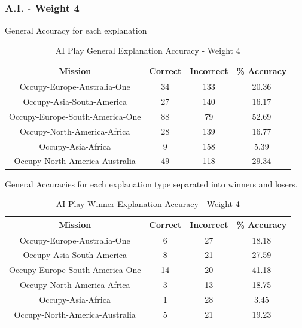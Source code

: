 \documentclass[parskip]{cs4rep}
\begin{document}
\newpage

\subsubsection{A.I. - Weight 4}

General Accuracy for each explanation

\begin{table}[ht]
\centering
\begin{tabular}{|c|c|c|c|}
\hline 
\textbf{Mission} & \textbf{Correct} & \textbf{Incorrect} & \textbf{\% Accuracy} \\ 
\hline 
Occupy-Europe-Australia-One & 34 & 133 & 20.36 \\  
\hline 
Occupy-Asia-South-America & 27 & 140 & 16.17 \\ 
\hline
Occupy-Europe-South-America-One & 88 & 79 & 52.69 \\
\hline
Occupy-North-America-Africa & 28 & 139 & 16.77 \\
\hline
Occupy-Asia-Africa & 9 & 158 & 5.39 \\
\hline
Occupy-North-America-Australia & 49 & 118 & 29.34 \\
\hline
\end{tabular}
\caption{AI Play General Explanation Accuracy - Weight 4}
\label{table:ai-4-general-accuracy}
\end{table}

General Accuracies for each explanation type separated into winners and losers.

\begin{table}[ht]
\centering
\begin{tabular}{|c|c|c|c|}
\hline 
\textbf{Mission} & \textbf{Correct} & \textbf{Incorrect} & \textbf{\% Accuracy} \\ 
\hline 
Occupy-Europe-Australia-One & 6 & 27 & 18.18 \\  
\hline 
Occupy-Asia-South-America & 8 & 21 & 27.59 \\ 
\hline
Occupy-Europe-South-America-One & 14 & 20 & 41.18 \\
\hline
Occupy-North-America-Africa & 3 & 13 & 18.75 \\
\hline
Occupy-Asia-Africa & 1 & 28 & 3.45 \\
\hline
Occupy-North-America-Australia & 5 & 21 & 19.23 \\
\hline
\end{tabular}
\caption{AI Play Winner Explanation Accuracy - Weight 4}
\label{table:ai-4-winner-accuracy}
\end{table}
\end{document}
